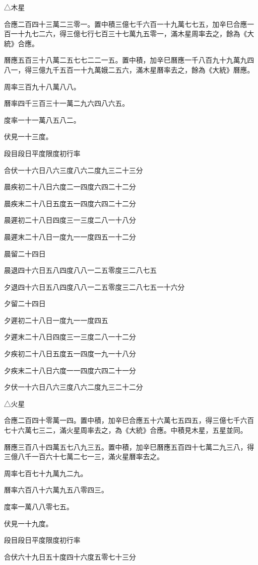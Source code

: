 △木星

合應二百四十三萬二三零一。置中積三億七千六百一十九萬七七五，加辛巳合應一百一十九七二六，得三億七行七百三十七萬九五零一，滿木星周率去之，餘為《大統》合應。

曆應五百三十八萬二五七七二二一五。置中積，加辛巳曆應一千八百九十九萬九四八一，得三億九千五百一十九萬娥二五六，滿木星曆率去之，餘為《大統》曆應。

周率三百九十八萬八八。

曆率四千三百三十一萬二九六四八六五。

度率一十一萬八五八二。

伏見一十三度。

段目段日平度限度初行率

合伏一十六日八六三度八六二度九三二十三分

晨疾初二十八日六度二一四度六四二十二分

晨疾末二十八日五度五一四度六四二十二分

晨遲初二十八日四度三一三度二八一十八分

晨遲末二十八日一度九一一度四五一十二分

晨留二十四日

晨退四十六日五八四度八八一二五零度三二八七五

夕退四十六日五八四度八八一二五零度三二八七五一十六分

夕留二十四日

夕遲初二十八日一度九一一度四五

夕遲末二十八日四度三一三度二八一十二分

夕疾初二十八日五度五一四度一九一十八分

夕疾末二十八日六度一一四度六四二十一分

夕伏一十六日八六三度八六二度九三二十二分

△火星

合應二百四十零萬一四。置中積，加辛巳合應五十六萬七五四五，得三億七千六百七十六萬七三二，滿火星周率去之，為《大統》合應。中積見木星，五星並同。

曆應三百八十四萬五七八九三五。置中積，加辛巳曆應五百四十七萬二九三八，得三億八千一百六十七萬二七一三，滿火星曆率去之。

周率七百七十九萬九二九。

曆率六百八十六萬九五八零四三。

度率一萬八八零七五。

伏見一十九度。

段目段日平度限度初行率

合伏六十九日五十度四十六度五零七十三分

